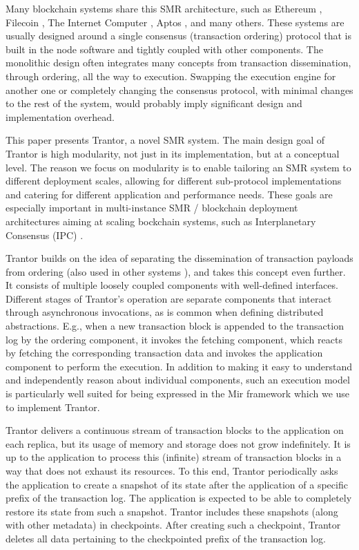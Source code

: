 \documentclass{article}
\begin{document}
Many blockchain systems share this SMR architecture, such as Ethereum \cite{ethereum}, Filecoin \cite{filecoin}, The Internet Computer \cite{dfinity}, Aptos \cite{aptos}, and many others.
These systems are usually designed around a single consensus (transaction ordering) protocol that is built in the node software and tightly coupled with other components.
The monolithic design often integrates many concepts from transaction dissemination, through ordering, all the way to execution.
Swapping the execution engine for another one or completely changing the consensus protocol,
with minimal changes to the rest of the system, would probably imply significant design and implementation overhead.

This paper presents Trantor, a novel SMR system.
The main design goal of Trantor is high modularity, not just in its implementation, but at a conceptual level.
The reason we focus on modularity is to enable tailoring an SMR system to different deployment scales,
allowing for different sub-protocol implementations and catering for different application and performance needs.
These goals are especially important in multi-instance SMR / blockchain deployment architectures aiming at scaling bockchain systems, such as Interplanetary Consensus (IPC) \cite{ipc}.

Trantor builds on the idea of separating the dissemination of transaction payloads from ordering
(also used in other systems \cite{modularblockchain,narwhal,bullshark}),
and takes this concept even further.
It consists of multiple loosely coupled components with well-defined interfaces.
Different stages of Trantor’s operation are separate components that interact through asynchronous invocations, as is common when defining distributed abstractions.
E.g., when a new transaction block is appended to the transaction log by the ordering component,
it invokes the fetching component, which reacts by fetching the corresponding transaction data
and invokes the application component to perform the execution.
In addition to making it easy to understand and independently reason about individual components,
such an execution model is particularly well suited for being expressed in the Mir framework \cite{mir} which we use to implement Trantor.


Trantor delivers a continuous stream of transaction blocks to the application on each replica,
but its usage of memory and storage does not grow indefinitely.
It is up to the application to process this (infinite) stream of transaction blocks in a way that does not exhaust its resources.
To this end, Trantor periodically asks the application to create a snapshot of its state after the application of a specific prefix of the transaction log.
The application is expected to be able to completely restore its state from such a snapshot.
Trantor includes these snapshots (along with other metadata) in checkpoints.
After creating such a checkpoint, Trantor deletes all data pertaining to the checkpointed prefix of the transaction log.
\end{document}
